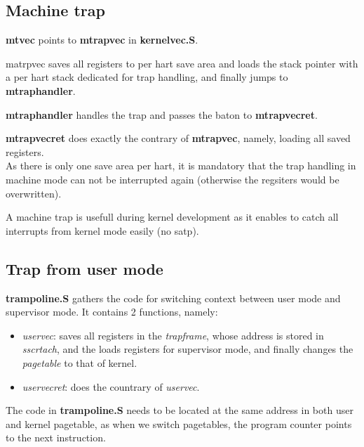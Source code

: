 \documentclass[10pt, a4paper]{article}
\begin{document}
\subsection{Machine trap}

\textbf{mtvec} points to \textbf{mtrapvec} in \textbf{kernelvec.S}.

matrpvec saves all registers to per hart save area and loads the stack pointer with a per hart stack dedicated for trap handling, and finally jumps to \textbf{mtraphandler}.

\textbf{mtraphandler} handles the trap and passes the baton to \textbf{mtrapvecret}.

\textbf{mtrapvecret} does exactly the contrary of \textbf{mtrapvec}, namely, loading all saved registers.\\

As there is only one save area per hart, it is mandatory that the trap handling in machine mode can not be interrupted again (otherwise the regsiters would be overwritten).

A machine trap is usefull during kernel development as it enables to catch all interrupts from kernel mode easily (no satp).

\subsection{Trap from user mode}

\textbf{trampoline.S} gathers the code for switching context between user mode and supervisor mode. It contains 2 functions, namely:
\begin{itemize}
\item \textit{uservec}: saves all registers in the \textit{trapframe}, whose address is stored in \textit{sscrtach}, and the loads registers for supervisor mode, and finally changes the \textit{pagetable} to that of kernel.
\item \textit{uservecret}: does the countrary of \textit{uservec}.
\end{itemize}

The code in \textbf{trampoline.S} needs to be located at the same address in both user and kernel pagetable, as when we switch pagetables, the program counter points to the next instruction.
\end{document}
